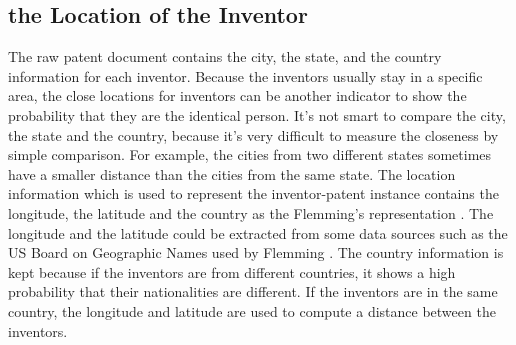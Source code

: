 \subsection{the Location of the Inventor}
The raw patent document contains the city, the state, and the country information for each inventor. Because the inventors usually stay in a specific area, the close locations for inventors can be another indicator to show the probability that they are the identical person. It's not smart to compare the city, the state and the country, because it's very difficult to measure the closeness by simple comparison. For example, the cities from two different states sometimes have a smaller distance than the cities from the same state. The location information which is used to represent the inventor-patent instance contains the longitude, the latitude and the country as the Flemming's representation \cite{RePEc:eee:respol:v:43:y:2014:i:6:p:941-955}. The longitude and the latitude could be extracted from some data sources such as the US Board on Geographic Names used by Flemming \cite{RePEc:eee:respol:v:43:y:2014:i:6:p:941-955}. The country information is kept because if the inventors are from different countries, it shows a high probability that their nationalities are different. If the inventors are in the same country, the longitude and latitude are used to compute a distance between the inventors.



